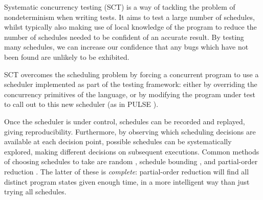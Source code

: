 Systematic concurrency testing (SCT) \citep{dpor, pbound, heisenbugs,
  empirical} is a way of tackling the problem of nondeterminism when
writing tests. It aims to test a large number of schedules, whilst
typically also making use of local knowledge of the program to reduce
the number of schedules needed to be confident of an accurate
result. By testing many schedules, we can increase our confidence that
any bugs which have not been found are unlikely to be exhibited.

SCT overcomes the scheduling problem by forcing a concurrent program
to use a scheduler implemented as part of the testing framework:
either by overriding the concurrency primitives of the language, or by
modifying the program under test to call out to this new scheduler (as
in PULSE \citep{pulse}).

Once the scheduler is under control, schedules can be recorded and
replayed, giving reproducibility. Furthermore, by observing which
scheduling decisions are available at each decision point, possible
schedules can be systematically explored, making different decisions
on subsequent executions. Common methods of choosing schedules to take
are random \citep{empirical}, schedule bounding \citep{pbound}, and
partial-order reduction \citep{dpor}. The latter of these is
\emph{complete}: partial-order reduction will find all distinct
program states given enough time, in a more intelligent way than just
trying all schedules.
